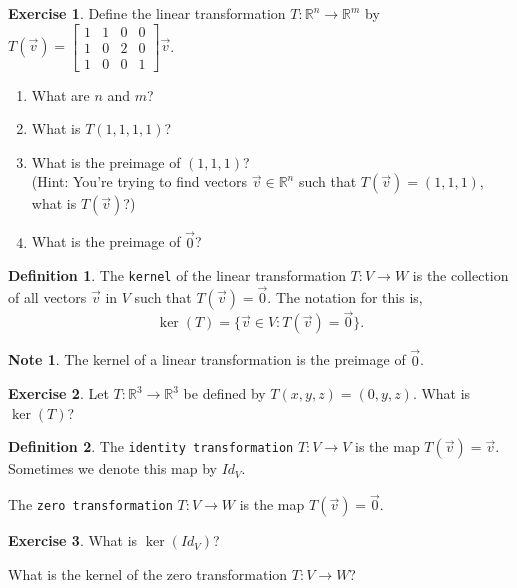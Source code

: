 \documentclass{beamer}
\newcommand{\R}{\mathbb{R}}
\newcommand{\fn}{\insertframenumber}
\theoremstyle{definition}
\newtheorem{exercise}{Exercise}
\newtheorem*{defn}{Definition}
\newtheorem*{nb}{Note}
\renewcommand{\emph}[1]{{\color{blue}\texttt{#1}}}
\begin{document}
\begin{frame}{\fn}
	\begin{exercise}
		Define the linear transformation $T:\R^n\to\R^m$ by $T(\vec v)=\begin{bmatrix}
		1&1&0&0\\1&0&2&0\\1&0&0&1	\end{bmatrix}\vec v$.
		\begin{enumerate}[label=(\alph*)]
			\item What are $n$ and $m$?
			\item What is $T(1,1,1,1)$?
			\item What is the preimage of $(1,1,1)$?\\
				(Hint: You're trying to find vectors $\vec v\in\R^n$ such that $T(\vec v)=(1,1,1)$, what is $T(\vec v)$?)
			\item What is the preimage of $\vec 0$?
		\end{enumerate}
	\end{exercise}
\end{frame}
\begin{frame}{\fn}
	\begin{defn}
		The \emph{kernel} of the linear transformation $T:V\to W$ is the collection of all vectors $\vec v$ in $V$ such that $T(\vec v)=\vec 0$.  The notation for this is,	\[\ker(T)=\{\vec v\in V:T(\vec v)=\vec 0\}.\]
	\end{defn}
	\begin{nb}
		The kernel of a linear transformation is the preimage of $\vec 0$.
	\end{nb}
	\begin{exercise}
		Let $T:\R^3\to\R^3$ be defined by $T(x,y,z)=(0,y,z)$.  What is $\ker(T)$?
	\end{exercise}
\end{frame}
\begin{frame}{\fn}
	\begin{defn}
		The \emph{identity transformation} $T:V\to V$ is the map $T(\vec v)=\vec v$.  Sometimes we denote this map by $Id_V$.
		
		The \emph{zero transformation} $T:V\to W$ is the map $T(\vec v)=\vec 0$.
	\end{defn}
	\begin{exercise}
		What is $\ker(Id_V)$?
		
		What is the kernel of the zero transformation $T:V\to W$?
	\end{exercise}
\end{frame}
\end{document}
